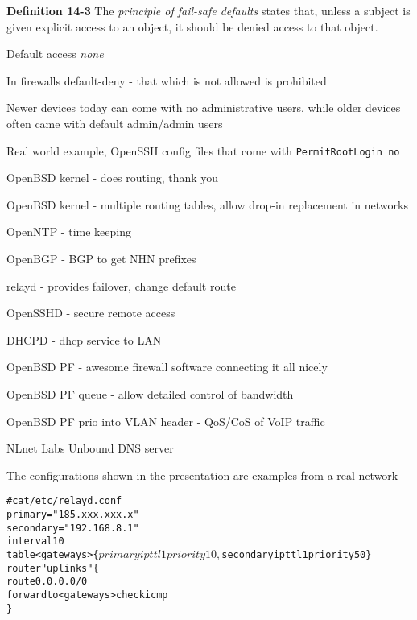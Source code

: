 \documentclass[Screen16to9,17pt]{foils}
\begin{document}

\begin{list1}
\item {\bf Definition 14-3} The \emph{principle of fail-safe defaults} states that, unless a subject is given explicit access to
 an object, it should be denied access to that object.
\item Default access \emph{none}
\item In firewalls default-deny - that which is not allowed is prohibited
\item Newer devices today can come with no administrative users, while older devices often came with default admin/admin users
\item Real world example, OpenSSH config files that come with \verb+PermitRootLogin no+
\end{list1}




\begin{list2}
\item OpenBSD kernel - does routing, thank you
\item OpenBSD kernel - multiple routing tables, allow drop-in replacement in networks
\item OpenNTP - time keeping
\item OpenBGP - BGP to get NHN prefixes
\item relayd - provides failover, change default route
\item OpenSSHD - secure remote access
\item DHCPD - dhcp service to LAN
\item OpenBSD PF - awesome firewall software connecting it all nicely
\item OpenBSD PF queue - allow detailed control of bandwidth
\item OpenBSD PF prio into VLAN header - QoS/CoS of VoIP traffic
\item NLnet Labs Unbound DNS server 
\end{list2}

The configurations shown in the presentation are examples from a real network


\begin{alltt}\footnotesize
# cat /etc/relayd.conf
primary = "185.xxx.xxx.x"
secondary = "192.168.8.1"
interval 10
table <gateways> \{ $primary ip ttl 1 priority 10, $secondary ip ttl 1 priority 50 \}
router "uplinks" \{
        route 0.0.0.0/0
        forward to <gateways> check icmp
\}
\end{alltt}
\end{document}
